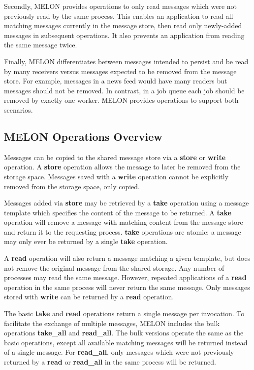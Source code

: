 \documentclass[lnicst]{svmultln}
\begin{document}
Secondly, MELON provides operations to only read messages which were not previously read by the same process. This enables an application to read all matching messages currently in the message store, then read only newly-added messages in subsequent operations. It also prevents an application from reading the same message twice.

Finally, MELON differentiates between messages intended to persist and be read by many receivers versus messages expected to be removed from the message store. For example, messages in a news feed would have many readers but messages should not be removed. In contrast, in a job queue each job should be removed by exactly one worker. MELON provides operations to support both scenarios.

\subsection{MELON Operations Overview}

Messages can be copied to the shared message store via a \textbf{store} or \textbf{write} operation. A \textbf{store} operation allows the message to later be removed from the storage space. Messages saved with a \textbf{write} operation cannot be explicitly removed from the storage space, only copied.

Messages added via \textbf{store} may be retrieved by a \textbf{take} operation using a message template which specifies the content of the message to be returned. A \textbf{take} operation will remove a message with matching content from the message store and return it to the requesting process. \textbf{take} operations are atomic: a message may only ever be returned by a single \textbf{take} operation.

A \textbf{read} operation will also return a message matching a given template, but does not remove the original message from the shared storage. Any number of processes may read the same message. However, repeated applications of a \textbf{read} operation in the same process will never return the same message. Only messages stored with \textbf{write} can be returned by a \textbf{read} operation.

The basic \textbf{take} and \textbf{read} operations return a single message per invocation. To facilitate the exchange of multiple messages, MELON includes the bulk operations \textbf{take\_all} and \textbf{read\_all}. The bulk versions operate the same as the basic operations, except all available matching messages will be returned instead of a single message. For \textbf{read\_all}, only messages which were not previously returned by a \textbf{read} or \textbf{read\_all} in the same process will be returned.
\end{document}
